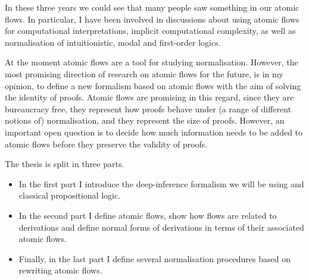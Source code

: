 In these three years we could see that many people saw something in our atomic flows. In particular, I have been involved in discussions about using atomic flows for computational interpretations, implicit computational complexity, as well as normalisation of intuitionistic, modal and first-order logics.

At the moment atomic flows are a tool for studying normalisation. However, the most promising direction of research on atomic flows for the future, is in my opinion, to define a new formalism based on atomic flows with the aim of solving the identity of proofs. Atomic flows are promising in this regard, since they are bureaucracy free, they represent how proofs behave under (a range of different notions of) normalisation, and they represent the size of proofs. However, an important open question is to decide how much information needs to be added to atomic flows before they preserve the validity of proofs.

The thesis is split in three parts.
\begin{itemize}
\item In the first part I introduce the deep-inference formalism we will be using and classical propositional logic.
\item In the second part I define atomic flows, show how flows are related to derivations and define normal forms of derivations in terms of their associated atomic flows.
\item Finally, in the last part I define several normalisation procedures based on rewriting atomic flows.
\end{itemize}
